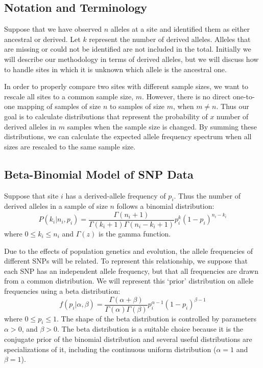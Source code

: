 \documentclass[11pt,letterpaper]{article}
\begin{document}
\subsection{Notation and Terminology}

Suppose that we have observed $n$ alleles at a site and identified them as either ancestral or derived.   Let $k$ represent the number of derived alleles.  Alleles that are missing or could not be identified are not included in the total.  Initially we will describe our methodology in terms of derived alleles, but we will discuss how to handle sites in which it is unknown which allele is the ancestral one.


In order to properly compare two sites with different sample sizes, we want to rescale all sites to a common sample size, $m$.  However, there is no direct one-to-one mapping of samples of size $n$ to samples of size $m$, when $m \ne n$.  Thus our goal is to calculate distributions that represent the probability of $x$ number of derived alleles in $m$ samples when the sample size is changed.  By summing these distributions, we can calculate the expected allele frequency spectrum when all sizes are rescaled to the same sample size.

\subsection{Beta-Binomial Model of SNP Data}

Suppose that site $i$ has a derived-allele frequency of $p_i$.  Thus the number of derived alleles in a sample of size $n$ follows a binomial distribution:
\[
P(k_i|n_i,p_i) = \frac{\Gamma(n_i+1)}{\Gamma(k_i+1) \Gamma(n_i-k_i+1)}%
p_i^k (1-p_i)^{n_i-k_i}
\]
where $0 \le k_i \le n_i$ and $\Gamma(z)$ is the gamma function.


Due to the effects of population genetics and evolution, the allele frequencies of different SNPs will be related.  To represent this relationship, we suppose that each SNP has an independent allele frequency, but that all frequencies are drawn from a common distribution.  We will represent this `prior' distribution on allele frequencies using a beta distribution:
\[
f(p_i|\alpha,\beta) = \frac{\Gamma(\alpha+\beta)}{\Gamma(\alpha)\Gamma(\beta)}%
p_i^{\alpha-1}(1-p_i)^{\beta-1}
\]
where $0 \le p_i \le 1$.  The shape of the beta distribution is controlled by parameters $\alpha > 0$, and $\beta > 0$.  The beta distribution is a suitable choice because it is the conjugate prior of the binomial distribution and several useful distributions are specializations of it, including the continuous uniform distribution ($\alpha=1$ and $\beta=1$).
\end{document}
